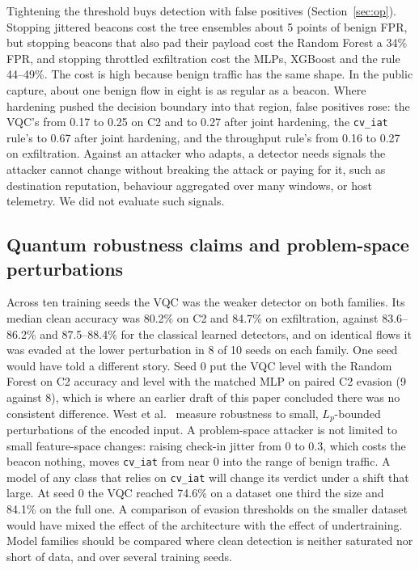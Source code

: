 \documentclass[preprint,12pt]{elsarticle}
\begin{document}
Tightening the threshold buys detection with false positives (Section~\ref{sec:op}). Stopping jittered
beacons cost the tree ensembles about 5 points of benign FPR, but stopping beacons that also pad their
payload cost the Random Forest a 34\% FPR, and stopping throttled exfiltration cost the MLPs, XGBoost and
the rule 44--49\%. The cost is high because benign traffic has the same shape. In the public capture, about one benign flow in eight is as regular as a beacon. Where hardening pushed
the decision boundary into that region, false positives rose: the VQC's from 0.17 to 0.25 on C2 and
to 0.27 after joint hardening, the \texttt{cv\_iat} rule's to 0.67 after joint hardening, and the
throughput rule's from 0.16 to 0.27 on exfiltration. Against an attacker who adapts, a detector
needs signals the attacker cannot change without breaking the attack or paying for it, such as
destination reputation, behaviour aggregated over many windows, or host telemetry. We did not evaluate
such signals.

\subsection{Quantum robustness claims and problem-space perturbations}
Across ten training seeds the VQC was the weaker detector on both families. Its median clean accuracy
was 80.2\% on C2 and 84.7\% on exfiltration, against 83.6--86.2\% and 87.5--88.4\% for the classical
learned detectors, and on identical flows it was evaded at the lower perturbation in 8 of 10 seeds on
each family. One seed would have told a different story. Seed 0 put the VQC level with the Random
Forest on C2 accuracy and level with the matched MLP on paired C2 evasion (9 against 8), which is where
an earlier draft of this paper concluded there was no consistent difference. West et al.~\cite{west2023nature} measure robustness to small,
$L_p$-bounded perturbations of the encoded input. A problem-space attacker is not limited to small
feature-space changes: raising check-in jitter from 0 to 0.3, which costs the beacon nothing, moves
\texttt{cv\_iat} from near 0 into the range of benign traffic. A model of any class that relies on
\texttt{cv\_iat} will change its verdict under a shift that large. At seed 0 the VQC reached 74.6\% on
a dataset one third the size and 84.1\% on the full one. A comparison of evasion thresholds on the
smaller dataset would have mixed the effect of the architecture with the effect of undertraining. Model
families should be compared where clean detection is neither saturated nor short of data, and over
several training seeds.
\end{document}
